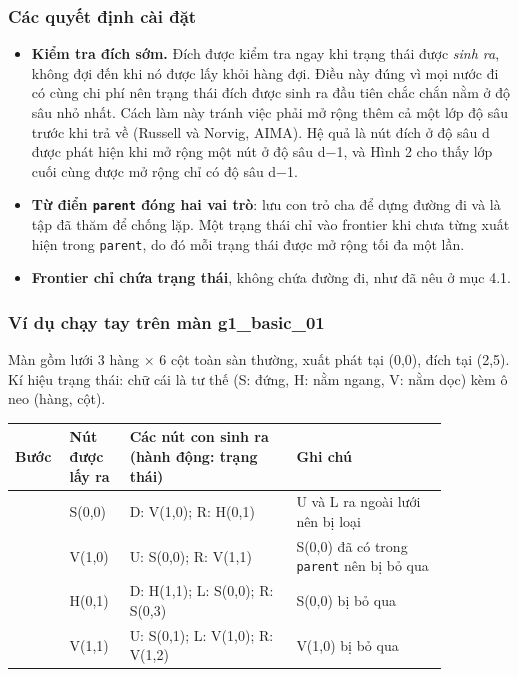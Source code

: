 \subsubsection{Các quyết định cài đặt}

\begin{itemize}
\item \textbf{Kiểm tra đích sớm.} Đích được kiểm tra ngay khi trạng thái được \emph{sinh ra}, không đợi đến khi nó được lấy khỏi hàng đợi. Điều này đúng vì mọi nước đi có cùng chi phí nên trạng thái đích được sinh ra đầu tiên chắc chắn nằm ở độ sâu nhỏ nhất. Cách làm này tránh việc phải mở rộng thêm cả một lớp độ sâu trước khi trả về (Russell và Norvig, AIMA). Hệ quả là nút đích ở độ sâu d được phát hiện khi mở rộng một nút ở độ sâu d−1, và Hình 2 cho thấy lớp cuối cùng được mở rộng chỉ có độ sâu d−1.
\item \textbf{Từ điển \texttt{parent} đóng hai vai trò}: lưu con trỏ cha để dựng đường đi và là tập đã thăm để chống lặp. Một trạng thái chỉ vào frontier khi chưa từng xuất hiện trong \texttt{parent}, do đó mỗi trạng thái được mở rộng tối đa một lần.
\item \textbf{Frontier chỉ chứa trạng thái}, không chứa đường đi, như đã nêu ở mục 4.1.
\end{itemize}

\subsubsection{Ví dụ chạy tay trên màn g1\_basic\_01}

Màn gồm lưới 3 hàng × 6 cột toàn sàn thường, xuất phát tại (0,0), đích tại (2,5). Kí hiệu trạng thái: chữ cái là tư thế (S: đứng, H: nằm ngang, V: nằm dọc) kèm ô neo (hàng, cột).

{\renewcommand{\arraystretch}{1.25}
\begin{longtable}{|>{\raggedleft\arraybackslash}p{0.073\linewidth}|>{\raggedright\arraybackslash}p{0.122\linewidth}|>{\raggedright\arraybackslash}p{0.349\linewidth}|>{\raggedright\arraybackslash}p{0.316\linewidth}|}
\hline
\textbf{Bước} & \textbf{Nút được lấy ra} & \textbf{Các nút con sinh ra (hành động: trạng thái)} & \textbf{Ghi chú} \\ \hline
\endhead
\hline
\endlastfoot
1 & S(0,0) & D: V(1,0); R: H(0,1) & U và L ra ngoài lưới nên bị loại \\ \hline
2 & V(1,0) & U: S(0,0); R: V(1,1) & S(0,0) đã có trong \texttt{parent} nên bị bỏ qua \\ \hline
3 & H(0,1) & D: H(1,1); L: S(0,0); R: S(0,3) & S(0,0) bị bỏ qua \\ \hline
4 & V(1,1) & U: S(0,1); L: V(1,0); R: V(1,2) & V(1,0) bị bỏ qua \\
\end{longtable}
}

